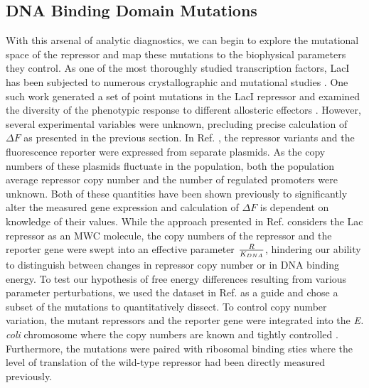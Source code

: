 \subsection{DNA Binding Domain Mutations}
With this arsenal of analytic diagnostics, we can begin to explore the
mutational space of the repressor and map these mutations to the biophysical
parameters they control. As one of the most thoroughly studied transcription
factors, LacI has been subjected to numerous crystallographic and mutational
studies \cite{Daber2007, Daber2009a, Lewis1996, Swerdlow2014}. One such work
generated a set of point mutations in the LacI repressor and
examined the diversity of the phenotypic response to different allosteric
effectors \cite{Daber2011a}. However, several experimental variables were
unknown, precluding precise calculation of $\Delta F$ as presented in the
previous section. In Ref. \cite{Daber2011a}, the repressor variants and the
fluorescence reporter were expressed from separate plasmids. As the copy numbers
of these plasmids fluctuate in the population, both the population average
repressor copy number and the number of regulated promoters were unknown. Both of these
quantities have been shown previously to significantly alter the measured gene
expression and calculation of $\Delta F$ is dependent on knowledge of their values. While the approach presented in Ref. \cite{Daber2011a} considers the
Lac repressor as an MWC molecule, the copy numbers of the repressor and
the reporter gene were swept into an effective parameter ${R \over K_{DNA}}$,
hindering our ability to distinguish between changes in repressor copy number or
in DNA binding energy. To
test our hypothesis of free energy differences resulting from various parameter
perturbations, we used the dataset in Ref. \cite{Daber2011a} as a guide and
chose a subset of the mutations to quantitatively dissect. To control copy
number variation, the mutant repressors and the reporter gene were integrated
into the \textit{E. coli} chromosome where the copy numbers are known and
tightly controlled \cite{Garcia2011, Razo-Mejia2018}. Furthermore, the mutations
were paired with ribosomal binding sties where the level of translation of the
wild-type repressor had been directly measured previously\cite{Garcia2011}.


